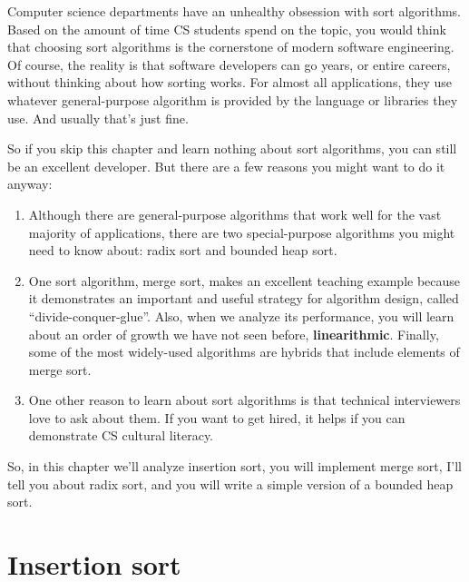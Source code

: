 \documentclass[12pt]{book}
\theoremstyle{exercise}
\begin{document}
Computer science departments have an unhealthy obsession with sort
algorithms. Based on the amount of time CS students spend on the topic,
you would think that choosing sort algorithms is the cornerstone of
modern software engineering. Of course, the reality is that software
developers can go years, or entire careers, without thinking about how
sorting works. For almost all applications, they use whatever
general-purpose algorithm is provided by the language or libraries they
use. And usually that's just fine.


So if you skip this chapter and learn nothing about sort algorithms,
you can still be an excellent developer. But there are a few reasons
you might want to do it anyway:

\begin{enumerate}

\item
  Although there are general-purpose algorithms that work well for the
  vast majority of applications, there are two special-purpose
  algorithms you might need to know about: radix sort and bounded heap
  sort.

\item
  One sort algorithm, merge sort, makes an excellent teaching example
  because it demonstrates an important and useful strategy for
  algorithm design, called ``divide-conquer-glue''. Also, when we
  analyze its performance, you will learn about an order of growth we
  have not seen before, {\bf linearithmic}. Finally, some of the most
  widely-used algorithms are hybrids that include elements of merge
  sort.

\item
  One other reason to learn about sort algorithms is that technical
  interviewers love to ask about them. If you want to get hired, it
  helps if you can demonstrate CS cultural literacy.

\end{enumerate}

So, in this chapter we'll analyze insertion sort, you will implement merge
sort, I'll tell you about radix sort, and you will write a simple
version of a bounded heap sort.



\section{Insertion sort}
\label{insertion-sort}
\end{document}
